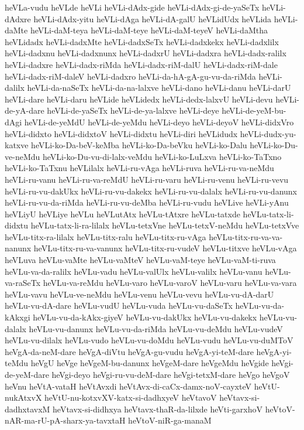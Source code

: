 {heVLa-vudu
heVLde
heVLi
heVLi-dAdx-gide
heVLi-dAdx-gi-de-yaSeTx
heVLi-dAdxre
heVLi-dAdx-yitu
heVLi-dAga
heVLi-dA-galU
heVLidUdx
heVLida
heVLi-daMte
heVLi-daM-teya
heVLi-daM-teye
heVLi-daM-teyeV
heVLi-daMtha
heVLidadx
heVLi-dadxMte
heVLi-dadxSeTx
heVLi-dadxkekx
heVLi-dadxlilx
heVLi-dadxnu
heVLi-dadxnunx
heVLi-dadxrU
heVLi-dadxra
heVLi-dadx-ralilx
heVLi-dadxre
heVLi-dadx-riMda
heVLi-dadx-riM-dalU
heVLi-dadx-riM-dale
heVLi-dadx-riM-daleV
heVLi-dadxro
heVLi-da-hA-gA-gu-vu-da-riMda
heVLi-dalilx
heVLi-da-naSeTx
heVLi-da-na-lalxve
heVLi-dano
heVLi-danu
heVLi-darU
heVLi-dare
heVLi-daru
heVLide
heVLidedx
heVLi-dedx-lalxvU
heVLi-devu
heVLi-de-yA-dare
heVLi-de-yaSeTx
heVLi-de-ya-lalxve
heVLi-deye
heVLi-de-yeM-bu-dAgi
heVLi-de-yeMdU
heVLi-de-yeMdu
heVLi-deyo
heVLi-deyoV
heVLi-didxVro
heVLi-didxto
heVLi-didxtoV
heVLi-didxtu
heVLi-diri
heVLidudx
heVLi-dudx-yu-katxve
heVLi-ko-Da-beV-keMba
heVLi-ko-Da-beVku
heVLi-ko-Dalu
heVLi-ko-Du-ve-neMdu
heVLi-ko-Du-vu-di-lalx-veMdu
heVLi-ko-LuLxva
heVLi-ko-TaTxno
heVLi-ko-TaTxnu
heVLilalx
heVLi-ru-vAga
heVLi-ruva
heVLi-ru-va-neMdu
heVLi-ru-vanu
heVLi-ru-va-reMdU
heVLi-ru-varu
heVLi-ru-venu
heVLi-ru-vevu
heVLi-ru-vu-dakUkx
heVLi-ru-vu-dakekx
heVLi-ru-vu-dalalx
heVLi-ru-vu-danunx
heVLi-ru-vu-da-riMda
heVLi-ru-vu-deMba
heVLi-ru-vudu
heVLive
heVLi-yAnu
heVLiyU
heVLiye
heVLu
heVLutAtx
heVLu-tAtxre
heVLu-tatxde
heVLu-tatx-li-didxtu
heVLu-tatx-li-ra-lilalx
heVLu-tetxVne
heVLu-tetxV-neMdu
heVLu-tetxVve
heVLu-titx-ra-lilalx
heVLu-titx-ralu
heVLu-titx-ru-vAga
heVLu-titx-ru-va-va-nanunx
heVLu-titx-ru-va-vanunx
heVLu-titx-ru-vudeV
heVLu-titxve
heVLu-vAga
heVLuva
heVLu-vaMte
heVLu-vaMteV
heVLu-vaM-teye
heVLu-vaM-ti-ruva
heVLu-va-da-ralilx
heVLu-vadu
heVLu-valUlx
heVLu-valilx
heVLu-vanu
heVLu-va-raSeTx
heVLu-va-reMdu
heVLu-varo
heVLu-varoV
heVLu-varu
heVLu-va-vara
heVLu-vavu
heVLu-ve-neMdu
heVLu-venu
heVLu-vevu
heVLu-vu-dA-darU
heVLu-vu-dA-dare
heVLu-vudU
heVLu-vuda
heVLu-vu-daSeTx
heVLu-vu-da-kAkxgi
heVLu-vu-da-kAkx-giyeV
heVLu-vu-dakUkx
heVLu-vu-dakekx
heVLu-vu-dalalx
heVLu-vu-danunx
heVLu-vu-da-riMda
heVLu-vu-deMdu
heVLu-vudeV
heVLu-vu-dilalx
heVLu-vudo
heVLu-vu-doMdu
heVLu-vudu
heVLu-vu-duMToV
heVgA-da-neM-dare
heVgA-diVtu
heVgA-gu-vudu
heVgA-yi-teM-dare
heVgA-yi-teMdu
heVgU
heVge
heVgeM-bu-danunx
heVgeM-dare
heVgeMdu
heVgide
heVgi-de-yeM-dare
heVgi-deyo
heVgi-ru-vu-deM-dare
heVgi-tetxM-dare
heVgo
heVgoV
heVnu
heVtA-vataH
heVtAvxdi
heVtAvx-di-caCx-damx-noV-cayxteV
heVtU-nukAtxvX
heVtU-nu-kotxvXV-katx-si-dadhxyeV
heVtavoV
heVtavx-si-dadhxtavxM
heVtavx-si-didhxya
heVtavx-thaR-da-lilxde
heVti-garxhoV
heVtoV-nAR-ma-rU-pA-sharx-ya-tavxtaH
heVtoV-niR-ga-manaM
}
